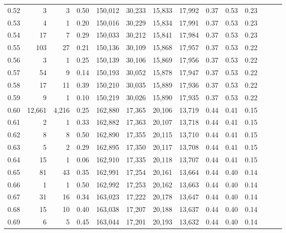 \begin{tabular}{rrrrrrrrrrrrrr}
0.52 &       3 &      3 &  0.50 &  150,012 &   30,233 &  15,833 &  17,992 &  0.37 &  0.53 &      0.23 \\
0.53 &       4 &      1 &  0.20 &  150,016 &   30,229 &  15,834 &  17,991 &  0.37 &  0.53 &      0.23 \\
0.54 &      17 &      7 &  0.29 &  150,033 &   30,212 &  15,841 &  17,984 &  0.37 &  0.53 &      0.23 \\
0.55 &     103 &     27 &  0.21 &  150,136 &   30,109 &  15,868 &  17,957 &  0.37 &  0.53 &      0.22 \\
0.56 &       3 &      1 &  0.25 &  150,139 &   30,106 &  15,869 &  17,956 &  0.37 &  0.53 &      0.22 \\
0.57 &      54 &      9 &  0.14 &  150,193 &   30,052 &  15,878 &  17,947 &  0.37 &  0.53 &      0.22 \\
0.58 &      17 &     11 &  0.39 &  150,210 &   30,035 &  15,889 &  17,936 &  0.37 &  0.53 &      0.22 \\
0.59 &       9 &      1 &  0.10 &  150,219 &   30,026 &  15,890 &  17,935 &  0.37 &  0.53 &      0.22 \\
0.60 &  12,661 &  4,216 &  0.25 &  162,880 &   17,365 &  20,106 &  13,719 &  0.44 &  0.41 &      0.15 \\
0.61 &       2 &      1 &  0.33 &  162,882 &   17,363 &  20,107 &  13,718 &  0.44 &  0.41 &      0.15 \\
0.62 &       8 &      8 &  0.50 &  162,890 &   17,355 &  20,115 &  13,710 &  0.44 &  0.41 &      0.15 \\
0.63 &       5 &      2 &  0.29 &  162,895 &   17,350 &  20,117 &  13,708 &  0.44 &  0.41 &      0.15 \\
0.64 &      15 &      1 &  0.06 &  162,910 &   17,335 &  20,118 &  13,707 &  0.44 &  0.41 &      0.15 \\
0.65 &      81 &     43 &  0.35 &  162,991 &   17,254 &  20,161 &  13,664 &  0.44 &  0.40 &      0.14 \\
0.66 &       1 &      1 &  0.50 &  162,992 &   17,253 &  20,162 &  13,663 &  0.44 &  0.40 &      0.14 \\
0.67 &      31 &     16 &  0.34 &  163,023 &   17,222 &  20,178 &  13,647 &  0.44 &  0.40 &      0.14 \\
0.68 &      15 &     10 &  0.40 &  163,038 &   17,207 &  20,188 &  13,637 &  0.44 &  0.40 &      0.14 \\
0.69 &       6 &      5 &  0.45 &  163,044 &   17,201 &  20,193 &  13,632 &  0.44 &  0.40 &      0.14 \\

\end{tabular}
